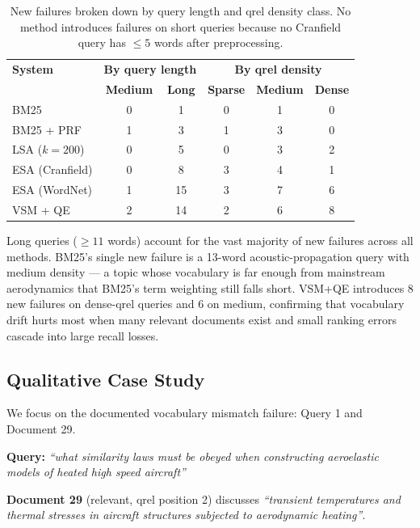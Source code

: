 \documentclass{article}
\begin{document}
\begin{table}[H]
\centering
\renewcommand{\arraystretch}{1.2}
\begin{tabular}{lcc|ccc}
\toprule
\textbf{System} & \multicolumn{2}{c|}{\textbf{By query length}} & \multicolumn{3}{c}{\textbf{By qrel density}} \\
& \textbf{Medium} & \textbf{Long} & \textbf{Sparse} & \textbf{Medium} & \textbf{Dense} \\
\midrule
BM25               & 0 & 1 & 0 & 1 & 0 \\
BM25 + PRF         & 1 & 3 & 1 & 3 & 0 \\
LSA ($k{=}200$)    & 0 & 5 & 0 & 3 & 2 \\
ESA (Cranfield)    & 0 & 8 & 3 & 4 & 1 \\
ESA (WordNet)      & 1 & 15 & 3 & 7 & 6 \\
VSM + QE           & 2 & 14 & 2 & 6 & 8 \\
\bottomrule
\end{tabular}
\caption{New failures broken down by query length and qrel density class. No method introduces failures on short queries because no Cranfield query has $\le 5$ words after preprocessing.}
\label{tab:boundary}
\end{table}

Long queries ($\ge 11$ words) account for the vast majority of new failures across all methods. BM25's single new failure is a 13-word acoustic-propagation query with medium density --- a topic whose vocabulary is far enough from mainstream aerodynamics that BM25's term weighting still falls short. VSM+QE introduces 8 new failures on dense-qrel queries and 6 on medium, confirming that vocabulary drift hurts most when many relevant documents exist and small ranking errors cascade into large recall losses.

\subsection{Qualitative Case Study}

We focus on the documented vocabulary mismatch failure: Query 1 and Document 29.

\textbf{Query:} \textit{``what similarity laws must be obeyed when constructing aeroelastic models of heated high speed aircraft''}

\textbf{Document 29} (relevant, qrel position 2) discusses \textit{``transient temperatures and thermal stresses in aircraft structures subjected to aerodynamic heating''}.
\end{document}
